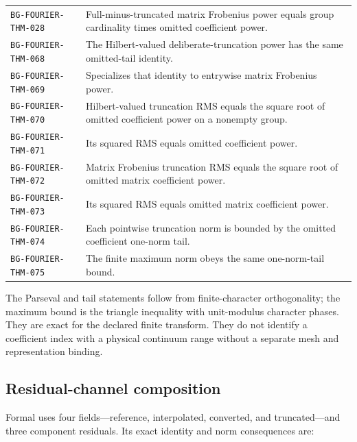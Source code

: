 \documentclass[11pt]{article}
\begin{document}
\begin{center}
\begin{longtable}{@{}>{\raggedright\arraybackslash}p{}
                         >{\raggedright\arraybackslash}p{}@{}}
\texttt{BG-FOURIER-THM-028} & Full-minus-truncated matrix Frobenius power equals group cardinality times omitted coefficient power. \\
\texttt{BG-FOURIER-THM-068} & The Hilbert-valued deliberate-truncation power has the same omitted-tail identity. \\
\texttt{BG-FOURIER-THM-069} & Specializes that identity to entrywise matrix Frobenius power. \\
\texttt{BG-FOURIER-THM-070} & Hilbert-valued truncation RMS equals the square root of omitted coefficient power on a nonempty group. \\
\texttt{BG-FOURIER-THM-071} & Its squared RMS equals omitted coefficient power. \\
\texttt{BG-FOURIER-THM-072} & Matrix Frobenius truncation RMS equals the square root of omitted matrix coefficient power. \\
\texttt{BG-FOURIER-THM-073} & Its squared RMS equals omitted matrix coefficient power. \\
\texttt{BG-FOURIER-THM-074} & Each pointwise truncation norm is bounded by the omitted coefficient one-norm tail. \\
\texttt{BG-FOURIER-THM-075} & The finite maximum norm obeys the same one-norm-tail bound. \\
\bottomrule
\end{longtable}
\end{center}

The Parseval and tail statements follow from finite-character orthogonality; the maximum
bound is the triangle inequality with unit-modulus character phases. They are exact for
the declared finite transform. They do not identify a coefficient index with a physical
continuum range without a separate mesh and representation binding.

\subsection{Residual-channel composition}

Formal uses four fields---reference, interpolated, converted, and truncated---and three
component residuals. Its exact identity and norm consequences are:
\end{document}
